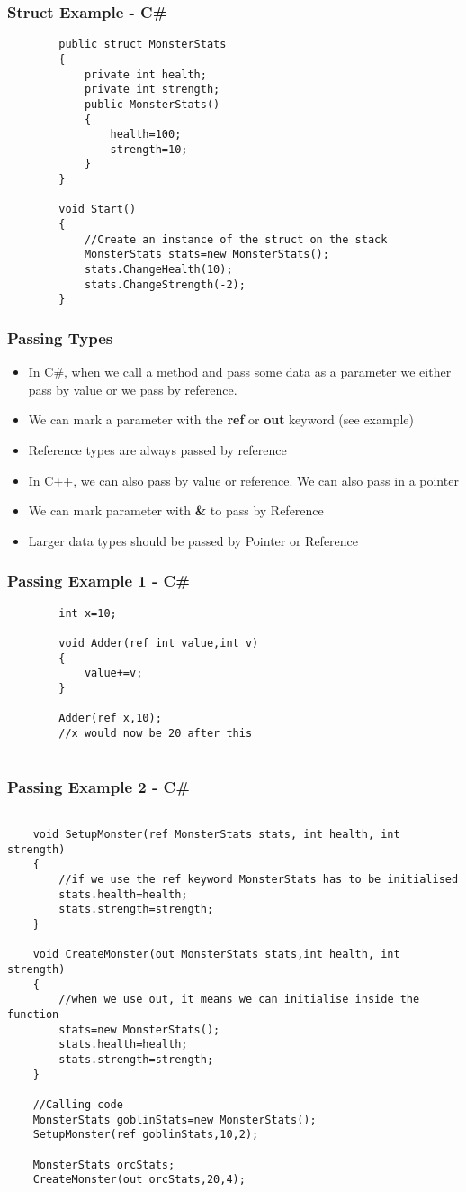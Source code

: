 \begin{frame}[fragile]
	\frametitle{Struct Example - C\#}
	\begin{lstlisting}
		public struct MonsterStats
		{
			private int health;
			private int strength;
			public MonsterStats()
			{
				health=100;
				strength=10;
			}
		}
		
		void Start()
		{		
			//Create an instance of the struct on the stack
			MonsterStats stats=new MonsterStats();
			stats.ChangeHealth(10);
			stats.ChangeStrength(-2);
		}	
	\end{lstlisting}
\end{frame}

\begin{frame}
	\frametitle{Passing Types}
	\begin{itemize}
	\item In C\#, when we call a method and pass some data as a parameter we either pass by value or we pass by reference. 
	\item We can mark a parameter with the \textbf{ref} or \textbf{out} keyword (see example)
	\item Reference types are always passed by reference
	\item In C++, we can also pass by value or reference. We can also pass in a pointer
	\item We can mark parameter with \textbf{\&} to pass by Reference 
	\item Larger data types should be passed by Pointer or Reference
	\end{itemize}
\end{frame}

\begin{frame}[fragile]
	\frametitle{Passing Example 1 - C\#}
	\begin{lstlisting}
		int x=10;
			
		void Adder(ref int value,int v)
		{
			value+=v;	
		}
		
		Adder(ref x,10);
		//x would now be 20 after this		
		
	\end{lstlisting}
\end{frame}

\begin{frame}[fragile]
	\frametitle{Passing Example 2 - C\#}
	\begin{lstlisting}
	
	void SetupMonster(ref MonsterStats stats, int health, int strength)
	{
		//if we use the ref keyword MonsterStats has to be initialised
		stats.health=health;
		stats.strength=strength;
	}
	
	void CreateMonster(out MonsterStats stats,int health, int strength)
	{
		//when we use out, it means we can initialise inside the function
		stats=new MonsterStats();
		stats.health=health;
		stats.strength=strength;
	}
	
	//Calling code
	MonsterStats goblinStats=new MonsterStats();
	SetupMonster(ref goblinStats,10,2);
	
	MonsterStats orcStats;
	CreateMonster(out orcStats,20,4);
	\end{lstlisting}
\end{frame}


